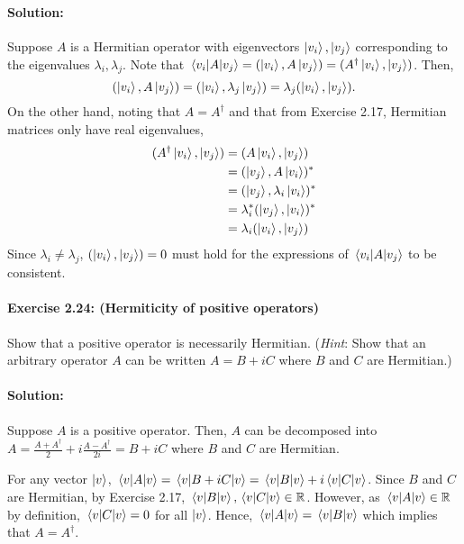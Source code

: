 \documentclass{article}
\begin{document}
\paragraph{Solution:} Suppose $A$ is a Hermitian operator with eigenvectors $\ket{v_i}, \ket{v_j}$ corresponding to the eigenvalues $\lambda_i, \lambda_j$. Note that $\mel{v_i}{A}{v_j} = (\ket{v_i}, A\ket{v_j}) = (A^\dagger \ket{v_i}, \ket{v_j})$. Then, \begin{equation*}
  (\ket{v_i}, A\ket{v_j}) = (\ket{v_i}, \lambda_j\ket{v_j}) = \lambda_j(\ket{v_i}, \ket{v_j}).
\end{equation*}
On the other hand, noting that $A = A^\dagger$ and that from Exercise 2.17, Hermitian matrices only have real eigenvalues, \begin{align*}
  (A^\dagger \ket{v_i}, \ket{v_j}) &= (A\ket{v_i}, \ket{v_j}) \\
    &= (\ket{v_j}, A\ket{v_i})^* \\
    &= (\ket{v_j}, \lambda_i\ket{v_i})^* \\
    &= \lambda_i^*(\ket{v_j}, \ket{v_i})^* \\
    &= \lambda_i(\ket{v_i}, \ket{v_j})
\end{align*}
Since $\lambda_i \neq \lambda_j$, $(\ket{v_i}, \ket{v_j}) = 0$ must hold for the expressions of $\mel{v_i}{A}{v_j}$ to be consistent.

\paragraph{\cite{mikeandike} Exercise 2.24: (Hermiticity of positive operators)} Show that a positive operator is necessarily Hermitian. (\emph{Hint}: Show that an arbitrary operator $A$ can be written $A = B + iC$ where $B$ and $C$ are Hermitian.)

\paragraph{Solution:} Suppose $A$ is a positive operator. Then, $A$ can be decomposed into $A = \frac{A + A^\dagger}{2} + i\frac{A - A^\dagger}{2i} = B + iC$ where $B$ and $C$ are Hermitian.

For any vector $\ket{v}$, $\mel{v}{A}{v} = \mel{v}{B + iC}{v} = \mel{v}{B}{v} + i\mel{v}{C}{v}$. Since $B$ and $C$ are Hermitian, by Exercise 2.17, $\mel{v}{B}{v}, \mel{v}{C}{v} \in \mathbb{R}$. However, as $\mel{v}{A}{v} \in \mathbb{R}$ by definition, $\mel{v}{C}{v} = 0$ for all $\ket{v}$. Hence, $\mel{v}{A}{v} = \mel{v}{B}{v}$ which implies that $A = A^\dagger$.


 
\end{document}
